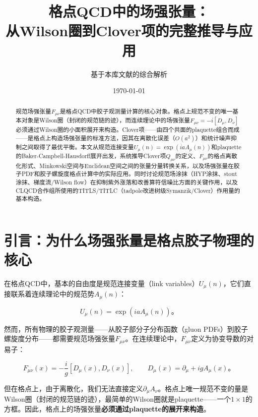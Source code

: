 \documentclass[12pt,a4paper]{ctexart}
\title{\heiti 格点QCD中的场强张量：\\
从Wilson圈到Clover项的完整推导与应用}
\author{基于本库文献的综合解析}
\date{\today}
\theoremstyle{definition}
\begin{document}
\maketitle

\begin{abstract}
\noindent
规范场强张量$F_{\mu\nu}$是格点QCD中胶子观测量计算的核心对象。格点上规范不变的唯一基本对象是Wilson圈（封闭的规范链的迹），而连续理论中的场强张量$F_{\mu\nu} = -i[D_\mu, D_\nu]$必须通过Wilson圈的小面积展开来构造。Clover项——由四个共面的plaquette组合而成——是格点上构造场强张量的标准方法，因其在离散化误差（$O(a^2)$）和统计噪声抑制之间取得了最优平衡。本文从规范连接变量$U_\mu(n) = \exp(iaA_\mu(n))$和plaquette的Baker-Campbell-Hausdorff展开出发，系统推导Clover项$Q_{\mu\nu}$的定义、$F_{\mu\nu}$的格点离散化形式、Minkowski空间与Euclidean空间之间的张量分量转换关系，以及场强张量在胶子PDF和胶子螺旋度格点计算中的实际应用。同时讨论规范场涂抹（HYP涂抹、stout涂抹、梯度流/Wilson flow）在抑制紫外涨落和改善算符信噪比方面的关键作用，以及CLQCD合作组所使用的TITLS/TITLC（tadpole改进树级Symanzik/Clover）作用量的基本构造。
\end{abstract}

\tableofcontents
\newpage

\section{引言：为什么场强张量是格点胶子物理的核心}

在格点QCD中，基本的自由度是规范连接变量（link variables）$U_\mu(n)$，它们直接联系着连续理论中的规范势$A_\mu(n)$：

\begin{equation}
U_\mu(n) = \exp(iaA_\mu(n))。
\label{eq:link_variable}
\end{equation}

然而，所有物理的胶子观测量——从胶子部分子分布函数（gluon PDFs）\cite{Chen2025gluon,NieMiera2025}到胶子螺旋度分布\cite{Egerer2022}——都需要规范场强张量$F_{\mu\nu}$。在连续理论中，$F_{\mu\nu}$定义为协变导数的对易子：

\begin{equation}
F_{\mu\nu}(x) = -\frac{i}{g}[D_\mu(x), D_\nu(x)], \qquad D_\mu(x) = \partial_\mu + igA_\mu(x)。
\label{eq:F_continuum}
\end{equation}

但在格点上，由于离散化，我们无法直接定义$\partial_\mu A_\nu$。格点上唯一规范不变的量是Wilson圈（封闭的规范链的迹），最简单的Wilson圈就是plaquette——一个$1 \times 1$的方框。因此，格点上的场强张量\textbf{必须通过plaquette的展开来构造}。
\end{document}
